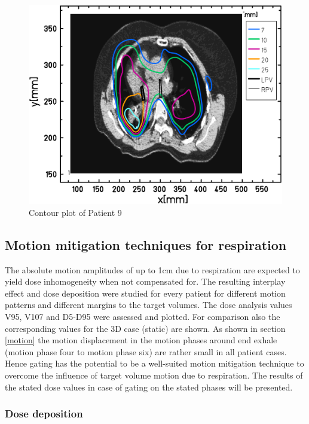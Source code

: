 \documentclass[type=dr, dr=rernat, accentcolor=tud7b,colorbacktitle, bigchapter, openright, twoside, 12pt ]{tudthesis}
\begin{document}
\begin{figure}[H]
\begin{center}
 \includegraphics[scale=0.22]{Contour_z_abs_RESP_Pat122_HUSkala_gedreht.png}
\caption{Contour plot of Patient 9 }
\label{contour_pat122}
\end{center}
\end{figure}

\newpage


\subsection{Motion mitigation techniques for respiration}
\label{mmt}
The absolute motion amplitudes of up to 1cm due to respiration are expected to yield dose inhomogeneity when not compensated for. The 
resulting interplay effect and dose deposition were studied for every patient for different motion patterns and different margins to the target 
volumes. The dose analysis values V95, V107 and D5-D95 were assessed and plotted. For comparison also the corresponding 
values for the 3D case (static) are shown. As shown in section \ref{motion} the motion displacement in the motion phases around 
end exhale (motion phase four to motion phase six) are rather small in all patient cases. Hence gating has the potential to be a 
well-suited motion mitigation technique to overcome the influence of target volume motion due to respiration. The results of the stated dose 
values in case of gating on the stated phases will be presented. 


\subsubsection{Dose deposition}
\end{document}
